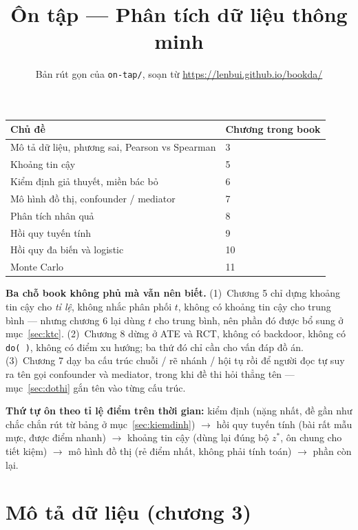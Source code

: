 \documentclass[11pt]{article}
\title{\vspace{-1.5cm}\bfseries Ôn tập — Phân tích dữ liệu thông minh}
\author{Bản rút gọn của \texttt{on-tap/}, soạn từ \url{https://lenbui.github.io/bookda/}}
\date{}
\begin{document}
\maketitle
\vspace{-1cm}

\begin{center}
\begin{tabular}{@{}ll@{}}
\toprule
\textbf{Chủ đề} & \textbf{Chương trong book} \\
\midrule
Mô tả dữ liệu, phương sai, Pearson vs Spearman & 3 \\
Khoảng tin cậy & 5 \\
Kiểm định giả thuyết, miền bác bỏ & 6 \\
Mô hình đồ thị, confounder / mediator & 7 \\
Phân tích nhân quả & 8 \\
Hồi quy tuyến tính & 9 \\
Hồi quy đa biến và logistic & 10 \\
Monte Carlo & 11 \\
\bottomrule
\end{tabular}
\end{center}

\textbf{Ba chỗ book không phủ mà vẫn nên biết.}
(1)~Chương 5 chỉ dựng khoảng tin cậy cho \emph{tỉ lệ}, không nhắc phân phối $t$,
không có khoảng tin cậy cho trung bình --- nhưng chương 6 lại dùng $t$ cho trung
bình, nên phần đó được bổ sung ở mục~\ref{sec:ktc}.
(2)~Chương 8 dừng ở ATE và RCT, không có backdoor, không có \texttt{do(\ )}, không
có điểm xu hướng; ba thứ đó chỉ cần cho vấn đáp đồ án.
(3)~Chương 7 dạy ba cấu trúc chuỗi / rẽ nhánh / hội tụ rồi để người đọc tự suy ra
tên gọi confounder và mediator, trong khi đề thi hỏi thẳng tên --- mục~\ref{sec:dothi}
gắn tên vào từng cấu trúc.

\textbf{Thứ tự ôn theo tỉ lệ điểm trên thời gian:}
kiểm định (nặng nhất, đề gần như chắc chắn rút từ bảng ở mục~\ref{sec:kiemdinh})
$\to$ hồi quy tuyến tính (bài rất mẫu mực, được điểm nhanh)
$\to$ khoảng tin cậy (dùng lại đúng bộ $z^{*}$, ôn chung cho tiết kiệm)
$\to$ mô hình đồ thị (rẻ điểm nhất, không phải tính toán)
$\to$ phần còn lại.

\tableofcontents

\newpage

\section{Mô tả dữ liệu (chương 3)}
\end{document}
